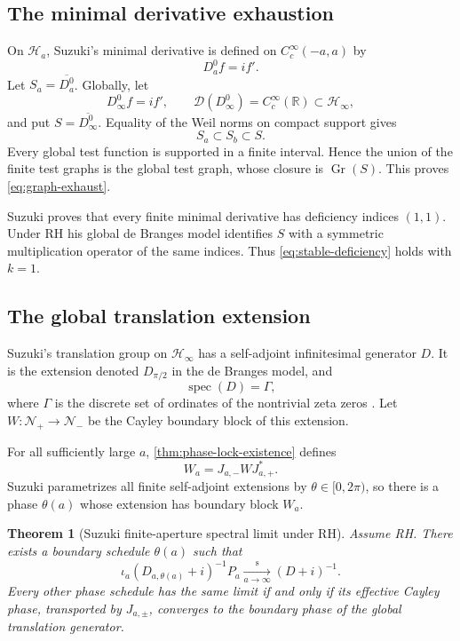 \documentclass[11pt]{article}
\newtheorem{theorem}{Theorem}[section]
\theoremstyle{remark}
\newcommand{\Hh}{\mathcal H}
\newcommand{\Dom}{\mathcal D}
\newcommand{\Gr}{\operatorname{Gr}}
\newcommand{\spec}{\operatorname{spec}}
\newcommand{\R}{\mathbb R}
\begin{document}
\subsection{The minimal derivative exhaustion}

On $\Hh_a$, Suzuki's minimal derivative is defined on $C_c^\infty(-a,a)$ by
\[
 D_a^0f=i f'.
\]
Let $S_a=\overline{D_a^0}$.  Globally, let
\[
 D_\infty^0f=i f',
 \qquad \Dom(D_\infty^0)=C_c^\infty(\R)\subset\Hh_\infty,
\]
and put $S=\overline{D_\infty^0}$.  Equality of the Weil norms on compact support gives
\[
 S_a\subset S_b\subset S.
\]
Every global test function is supported in a finite interval.  Hence the union of the finite test
graphs is the global test graph, whose closure is $\Gr(S)$.  This proves
\eqref{eq:graph-exhaust}.

Suzuki proves that every finite minimal derivative has deficiency indices $(1,1)$.  Under RH his
global de Branges model identifies $S$ with a symmetric multiplication operator of the same
indices.  Thus \eqref{eq:stable-deficiency} holds with $k=1$.

\subsection{The global translation extension}

Suzuki's translation group on $\Hh_\infty$ has a self-adjoint infinitesimal generator $D$.
It is the extension denoted $D_{\pi/2}$ in the de Branges model, and
\begin{equation}\label{eq:global-spectrum}
 \spec(D)=\Gamma,
\end{equation}
where $\Gamma$ is the discrete set of ordinates of the nontrivial zeta zeros
\cite[Sections 7.2--7.5]{Suzuki2026}.  Let $W:\mathcal N_+\to\mathcal N_-$ be the Cayley boundary
block of this extension.

For all sufficiently large $a$, \cref{thm:phase-lock-existence} defines
\[
 W_a=J_{a,-}WJ_{a,+}^*.
\]
Suzuki parametrizes all finite self-adjoint extensions by $\theta\in[0,2\pi)$, so there is a phase
$\theta(a)$ whose extension has boundary block $W_a$.

\begin{theorem}[Suzuki finite-aperture spectral limit under RH]\label{thm:Suzuki-limit}
Assume RH.  There exists a boundary schedule $\theta(a)$ such that
\begin{equation}\label{eq:Suzuki-GSRC}
 \iota_a(D_{a,\theta(a)}+i)^{-1}P_a
 \xrightarrow[a\to\infty]{\mathrm{s}}
 (D+i)^{-1}.
\end{equation}
Every other phase schedule has the same limit if and only if its effective Cayley phase, transported
by $J_{a,\pm}$, converges to the boundary phase of the global translation generator.
\end{theorem}
\end{document}
